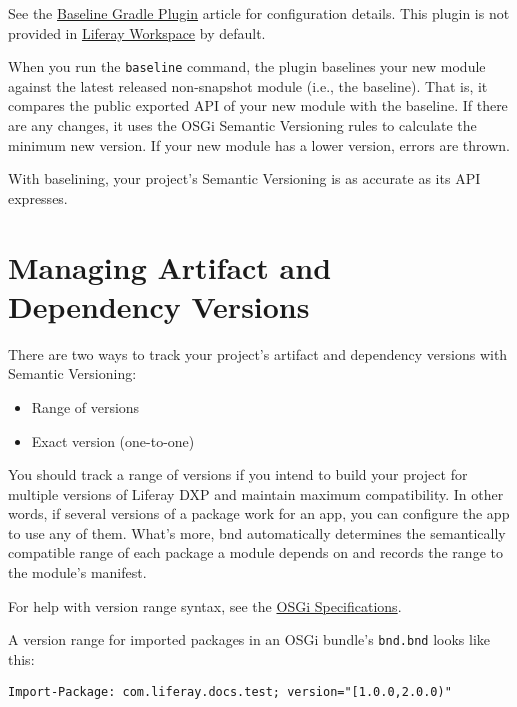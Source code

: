 See the
\href{/docs/7-2/reference/-/knowledge_base/r/baseline-gradle-plugin}{Baseline
Gradle Plugin} article for configuration details. This plugin is not
provided in
\href{/docs/7-2/reference/-/knowledge_base/r/liferay-workspace}{Liferay
Workspace} by default.

When you run the \texttt{baseline} command, the plugin baselines your
new module against the latest released non-snapshot module (i.e., the
baseline). That is, it compares the public exported API of your new
module with the baseline. If there are any changes, it uses the OSGi
Semantic Versioning rules to calculate the minimum new version. If your
new module has a lower version, errors are thrown.

With baselining, your project's Semantic Versioning is as accurate as
its API expresses.

\section{Managing Artifact and Dependency
Versions}\label{managing-artifact-and-dependency-versions}

There are two ways to track your project's artifact and dependency
versions with Semantic Versioning:

\begin{itemize}
\tightlist
\item
  Range of versions
\item
  Exact version (one-to-one)
\end{itemize}

You should track a range of versions if you intend to build your project
for multiple versions of Liferay DXP and maintain maximum compatibility.
In other words, if several versions of a package work for an app, you
can configure the app to use any of them. What's more, bnd automatically
determines the semantically compatible range of each package a module
depends on and records the range to the module's manifest.

For help with version range syntax, see the
\href{https://osgi.org/specification/osgi.core/7.0.0/framework.module.html\#i3189032}{OSGi
Specifications}.

A version range for imported packages in an OSGi bundle's
\texttt{bnd.bnd} looks like this:

\begin{verbatim}
Import-Package: com.liferay.docs.test; version="[1.0.0,2.0.0)"
\end{verbatim}

